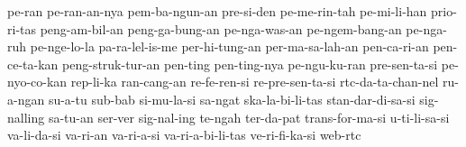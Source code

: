 {    pe-ran  pe-ran-an-nya
    pem-ba-ngun-an pre-si-den pe-me-rin-tah pe-mi-li-han prio-ri-tas peng-am-bil-an
    peng-ga-bung-an pe-nga-was-an pe-ngem-bang-an
    pe-nga-ruh pe-nge-lo-la pa-ra-lel-is-me per-hi-tung-an per-ma-sa-lah-an
    pen-ca-ri-an pen-ce-ta-kan peng-struk-tur-an pen-ting pen-ting-nya pe-ngu-ku-ran
    pre-sen-ta-si pe-nyo-co-kan
    rep-li-ka
    ran-cang-an re-fe-ren-si re-pre-sen-ta-si
    rtc-da-ta-chan-nel
    ru-a-ngan
    su-a-tu
    sub-bab si-mu-la-si sa-ngat ska-la-bi-li-tas
    stan-dar-di-sa-si sig-nalling
    sa-tu-an
    ser-ver
    sig-nal-ing
    te-ngah
    ter-da-pat
    trans-for-ma-si
    u-ti-li-sa-si
    va-li-da-si va-ri-an va-ri-a-si va-ri-a-bi-li-tas ve-ri-fi-ka-si
    web-rtc
}

